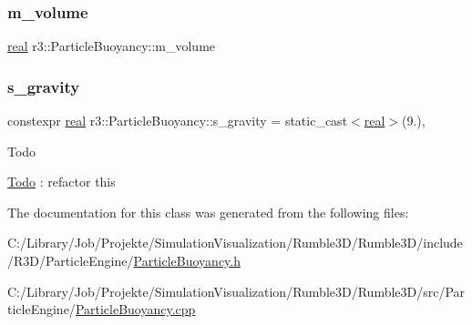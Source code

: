 \mbox{\label{classr3_1_1_particle_buoyancy_ade7d34f053371dadc2113563760599c9}} 
\subsubsection{\texorpdfstring{m\+\_\+volume}{m\_volume}}
{\footnotesize\ttfamily \mbox{\hyperlink{namespacer3_ab2016b3e3f743fb735afce242f0dc1eb}{real}} r3\+::\+Particle\+Buoyancy\+::m\+\_\+volume\hspace{0.3cm}{\ttfamily [protected]}}

\mbox{\label{classr3_1_1_particle_buoyancy_a15857a4724e0e91efd9ce45831d00cbd}} 
\subsubsection{\texorpdfstring{s\+\_\+gravity}{s\_gravity}}
{\footnotesize\ttfamily constexpr \mbox{\hyperlink{namespacer3_ab2016b3e3f743fb735afce242f0dc1eb}{real}} r3\+::\+Particle\+Buoyancy\+::s\+\_\+gravity = static\+\_\+cast$<$\mbox{\hyperlink{namespacer3_ab2016b3e3f743fb735afce242f0dc1eb}{real}}$>$(9.)\hspace{0.3cm}{\ttfamily [static]}, {\ttfamily [protected]}}

\begin{DoxyRefDesc}{Todo}
\item[\mbox{\hyperlink{todo__todo000001}{Todo}}]\+: refactor this \end{DoxyRefDesc}


The documentation for this class was generated from the following files\+:\begin{DoxyCompactItemize}
\item 
C\+:/\+Library/\+Job/\+Projekte/\+Simulation\+Visualization/\+Rumble3\+D/\+Rumble3\+D/include/\+R3\+D/\+Particle\+Engine/\mbox{\hyperlink{_particle_buoyancy_8h}{Particle\+Buoyancy.\+h}}\item 
C\+:/\+Library/\+Job/\+Projekte/\+Simulation\+Visualization/\+Rumble3\+D/\+Rumble3\+D/src/\+Particle\+Engine/\mbox{\hyperlink{_particle_buoyancy_8cpp}{Particle\+Buoyancy.\+cpp}}\end{DoxyCompactItemize}
